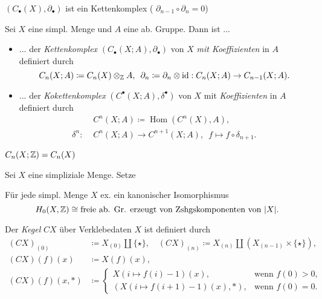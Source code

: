 \documentclass{cheat-sheet}
\DeclareMathOperator{\Hom}{Hom} %
\begin{document}
\begin{prop}
  $(C_\bullet(X),\partial_\bullet)$ ist ein Kettenkomplex (\dh{} $\partial_{n-1} \circ \partial_n = 0$)
\end{prop}

\begin{defn}
  Sei $X$ eine simpl. Menge und $A$ eine ab. Gruppe. Dann ist ...
  \begin{itemize}
    \item ... der \emph{Kettenkomplex} $(C_\bullet(X; A), \partial_\bullet)$ von $X$ \emph{mit Koeffizienten} in $A$ definiert durch
    \[
      C_n(X; A) \coloneqq C_n(X) \otimes_{\mathbb{Z}} A, \enspace
      \partial_n \coloneqq \partial_n \otimes \mathrm{id} : C_n(X; A) \to C_{n-1}(X; A).
    \]
    \item ... der \emph{Kokettenkomplex} $(C^\bullet(X; A), \delta^\bullet)$ von $X$ mit \emph{Koeffizienten} in $A$ definiert durch
    \begin{align*}
      & C^n(X; A) \coloneqq \Hom(C^n(X), A), \\
      \delta^n : \,\, & C^n(X; A) \to C^{n+1}(X; A), \enspace f \mapsto f \circ \delta_{n+1}.
    \end{align*}
  \end{itemize}
\end{defn}

\begin{beob}
  $C_n(X; \mathbb{Z}) = C_n(X)$
\end{beob}

\begin{nota}
  Sei $X$ eine simpliziale Menge. Setze
  \begin{itemize}
  \end{itemize}
\end{nota}

\begin{prop}
  Für jede simpl. Menge $X$ ex. ein kanonischer Isomorphismus
  \[ H_0(X, \mathbb{Z}) \cong \text{freie ab. Gr. erzeugt von Zshgskomponenten von $\lvert X\rvert$}. \]
\end{prop}

\begin{defn}
  Der \emph{Kegel} $CX$ über Verklebedaten $X$ ist definiert durch
  \begin{align*}
    (CX)_{(0)} & \coloneqq X_{(0)} \amalg \{ \star \}, \quad (CX)_{(n)} \coloneqq X_{(n)} \amalg (X_{(n-1)} \times \{ \star \}), \\
    (CX)(f)(x) & \coloneqq X(f)(x), \\
    (CX)(f)(x,*) &  \coloneqq \begin{cases}
      X(i \mapsto f(i) - 1)(x), & \text{wenn $f(0) > 0$,} \\
      (X(i \mapsto f(i{+}1) - 1)(x), *), & \text{wenn $f(0) = 0$.}
    \end{cases}
  \end{align*}
\end{defn}
\end{document}
